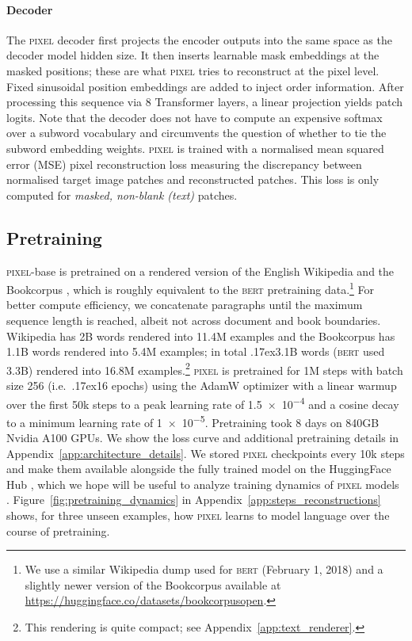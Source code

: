 \documentclass{article}
\newcommand{\model}{\textsc{pixel}\xspace}
\newcommand{\circa}{{\raise.17ex\hbox{}}}
\begin{document}
\vspace{-2mm}
\paragraph{Decoder} The \model decoder first projects the encoder outputs into the same space as the decoder model hidden size. It then inserts learnable mask embeddings at the masked positions; these are what \model tries to reconstruct at the pixel level. Fixed sinusoidal position embeddings \citep{DBLP:conf/nips/VaswaniSPUJGKP17} are added to inject order information. After processing this sequence via 8 Transformer layers, a linear projection yields patch logits. Note that the decoder does not have to compute an expensive softmax over a subword vocabulary and circumvents the question of whether to tie the subword embedding weights.
\model is trained with a normalised mean squared error (MSE) pixel reconstruction loss measuring the discrepancy between normalised target image patches and reconstructed patches. This loss is only computed for \emph{masked, non-blank (text)} patches. 

\vspace{-2mm}
\subsection{Pretraining}
\vspace{-2mm}

\model-base is pretrained on a rendered version of the English Wikipedia and the Bookcorpus \citep{Zhu_2015_ICCV}, which is roughly equivalent to the \textsc{bert} pretraining data.\footnote{We use a similar Wikipedia dump \citet{devlin-etal-2019-bert} used for \textsc{bert} (February 1, 2018) and a slightly newer version of the Bookcorpus available at \url{https://huggingface.co/datasets/bookcorpusopen}.} For better compute efficiency, we concatenate paragraphs until the maximum sequence length is reached, albeit not across document and book boundaries. Wikipedia has 2B words rendered into 11.4M examples and the Bookcorpus has 1.1B words rendered into 5.4M examples; in total \circa3.1B words (\textsc{bert} used 3.3B) rendered into 16.8M examples.\footnote{This rendering is quite compact; see Appendix~\ref{app:text_renderer}.} \model is pretrained for 1M steps with batch size 256 (i.e.\ \circa16 epochs) using the AdamW optimizer \citep{kingma-ba-2015-adam, loshchilov2018decoupled} with a linear warmup over the first 50k steps to a peak learning rate of \num{1.5e-4} and a cosine decay to a minimum learning rate of \num{1e-5}. Pretraining took 8 days on 840GB Nvidia A100 GPUs. We show the loss curve
and additional pretraining details in Appendix~\ref{app:architecture_details}. We stored \model checkpoints every 10k steps and make them available alongside the fully trained model on the HuggingFace Hub \citep{wolf-etal-2020-transformers},
which we hope will be useful to analyze training dynamics of \model models \citep{sellam2022the}. Figure~\ref{fig:pretraining_dynamics} in Appendix~\ref{app:steps_reconstructions} shows, for three unseen examples, how \model learns to model language over the course of pretraining.
\end{document}
